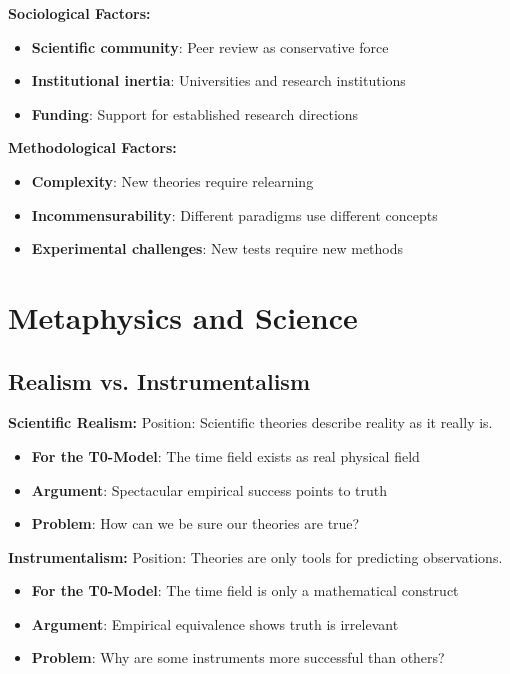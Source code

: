 \documentclass[12pt,a4paper]{report}
\begin{document}
	\textbf{Sociological Factors:}
	\begin{itemize}
		\item \textbf{Scientific community}: Peer review as conservative force
		\item \textbf{Institutional inertia}: Universities and research institutions
		\item \textbf{Funding}: Support for established research directions
	\end{itemize}
	
	\textbf{Methodological Factors:}
	\begin{itemize}
		\item \textbf{Complexity}: New theories require relearning
		\item \textbf{Incommensurability}: Different paradigms use different concepts
		\item \textbf{Experimental challenges}: New tests require new methods
	\end{itemize}
	
	\section{Metaphysics and Science}\label{sec:metaphysics_science}
	
	\subsection{Realism vs. Instrumentalism}\label{subsec:realism_instrumentalism}
	
	\textbf{Scientific Realism:}
	Position: Scientific theories describe reality as it really is.
	\begin{itemize}
		\item \textbf{For the T0-Model}: The time field exists as real physical field
		\item \textbf{Argument}: Spectacular empirical success points to truth
		\item \textbf{Problem}: How can we be sure our theories are true?
	\end{itemize}
	
	\textbf{Instrumentalism:}
	Position: Theories are only tools for predicting observations.
	\begin{itemize}
		\item \textbf{For the T0-Model}: The time field is only a mathematical construct
		\item \textbf{Argument}: Empirical equivalence shows truth is irrelevant
		\item \textbf{Problem}: Why are some instruments more successful than others?
	\end{itemize}
	
\end{document}

